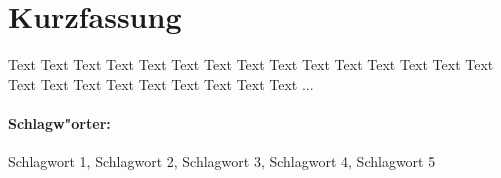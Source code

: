 \section*{\centering Kurzfassung}
Text Text Text Text Text Text Text Text Text Text Text Text Text Text Text Text Text Text Text Text Text Text Text Text ...

\paragraph*{Schlagw"orter:} Schlagwort 1, Schlagwort 2, Schlagwort 3, Schlagwort 4, Schlagwort 5
\newpage
